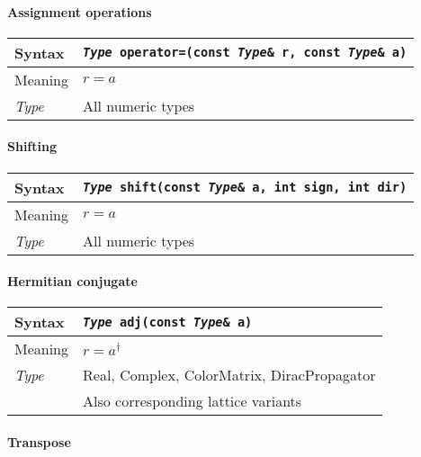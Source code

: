 \documentclass[12pt,letterpaper]{article}
\newcommand{\tReal}{Real}
\newcommand{\tComplex}{Complex}
\newcommand{\tColorMatrix}{ColorMatrix}
\newcommand{\tDiracPropagator}{DiracPropagator}
\newcommand{\allNumericTypes}{All numeric types}
\newcommand{\simLatticeVariants}{Also corresponding lattice variants}
\newcommand{\itt}{\it Type}
\newcommand{\protoUnaryShift}{{\tt {\it Type} shift(const {\it Type}\& a, int sign, int dir)}}
\newcommand{\protoUnaryQual}[1]{{\tt {\it Type} #1(const {\it Type}\& a)}}
\newcommand{\protoAssignmentQual}[1]{{\tt {\it Type} #1(const {\it Type}\& r, const {\it Type}\& a)}}
\begin{document}
\paragraph{Assignment operations}

\begin{flushleft}
  \begin{tabular}{|l|l|}
  \hline
  Syntax      & \protoAssignmentQual{operator=} \\
  \hline
  Meaning     & $r = a$ \\
  \hline
  \itt     & \allNumericTypes \\
  \hline
  \end{tabular}
\end{flushleft}

\paragraph{Shifting}

\begin{flushleft}
  \begin{tabular}{|l|l|}
  \hline
  Syntax      & \protoUnaryShift  \\
  \hline
  Meaning     & $r = a$ \\
  \hline
  \itt     & \allNumericTypes \\
  \hline
  \end{tabular}
\end{flushleft}


\paragraph{Hermitian conjugate}

\begin{flushleft}
  \begin{tabular}{|l|l|}
  \hline
  Syntax      & \protoUnaryQual{\tt adj}  \\
  \hline
  Meaning     & $r = a^\dagger$ \\
  \hline
  \itt        & \tReal, \tComplex, \tColorMatrix, \tDiracPropagator \\
              & \simLatticeVariants \\
  \hline
  \end{tabular}
\end{flushleft}

\paragraph{Transpose}
\end{document}
